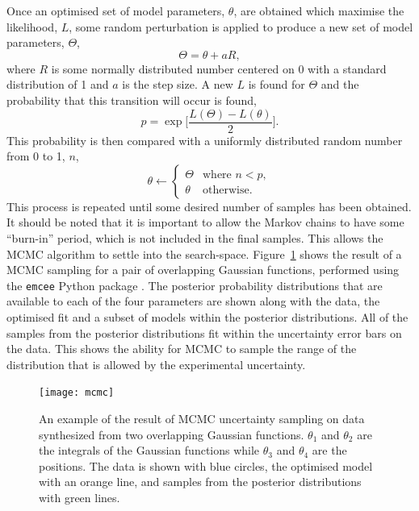 \documentclass[
 reprint,
 superscriptaddress,
 amsmath,amssymb,
 aps,
]{revtex4-1}
\begin{document}
Once an optimised set of model parameters, $\theta$, are obtained which maximise the likelihood, $L$, some random perturbation is applied to produce a new set of model parameters, $\Theta$,
%
\begin{equation}
    \Theta = \theta + aR,
\end{equation}
%
where $R$ is some normally distributed number centered on \num{0} with a standard distribution of \num{1} and $a$ is the step size.
A new $L$ is found for $\Theta$ and the probability that this transition will occur is found,
%
\begin{equation}
    p = \exp{\bigg[\frac{L(\Theta) - L(\theta)}{2}\bigg]}.
\end{equation}
%
This probability is then compared with a uniformly distributed random number from \num{0} to \num{1}, $n$,
%
\begin{equation}
    \theta \leftarrow
    \begin{cases}
        \Theta & \text{where } n < p,\\
        \theta & \text{otherwise}.
    \end{cases}
\end{equation}
%
This process is repeated until some desired number of samples has been obtained.
It should be noted that it is important to allow the Markov chains to have some ``burn-in'' period, which is not included in the final samples.
This allows the MCMC algorithm to settle into the search-space.
Figure~\ref{fig:mcmc} shows the result of a MCMC sampling for a pair of overlapping Gaussian functions, performed using the \texttt{emcee} Python package \cite{foremanmackey_emcee_2012}.
The posterior probability distributions that are available to each of the four parameters are shown along with the data, the optimised fit and a subset of models within the posterior distributions.
All of the samples from the posterior distributions fit within the uncertainty error bars on the data.
This shows the ability for MCMC to sample the range of the distribution that is allowed by the experimental uncertainty.
%
\begin{figure}[t]
    \texttt{[image: mcmc]}
    \caption{An example of the result of MCMC uncertainty sampling on data synthesized from two overlapping Gaussian functions. $\theta_1$ and $\theta_2$ are the integrals of the Gaussian functions while $\theta_3$ and $\theta_4$ are the positions. The data is shown with blue circles, the optimised model with an orange line, and samples from the posterior distributions with green lines.}
    \label{fig:mcmc}
\end{figure}
%
\end{document}
